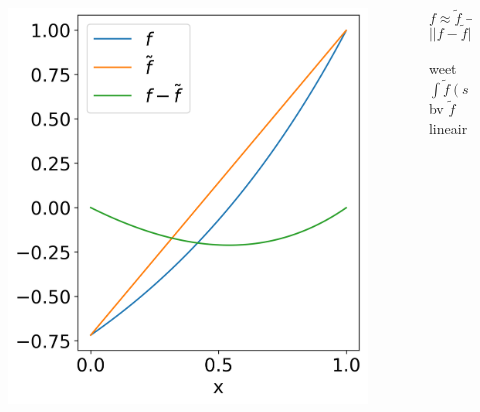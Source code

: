 \documentclass[18pt,aspectratio=149]{beamer}
\begin{document}
\begin{frame}
    \begin{columns}[t]
        \begin{column}{0.55\textwidth}
            \vspace*{-2cm}
            \begin{figure}[h]
                \includegraphics[height=0.8\textheight]{"imgs/control_variate.png"}
            \end{figure}
        \end{column}
        \begin{column}{0.45\textwidth}
            \pause
            \[
                f  \approx \tilde{f} \rightarrow
            \]\pause
            \vspace*{-1cm}
            \[
                ||f-\tilde{f}||_{2} \le ||f||_{2}
            \]
            \pause
            \vspace*{-1cm}
            \begin{center}
                weet $\int \tilde{f}(s)ds$ \\
                bv $\tilde{f}$ lineair
            \end{center}

        \end{column}
    \end{columns}

\end{frame}
\end{document}
